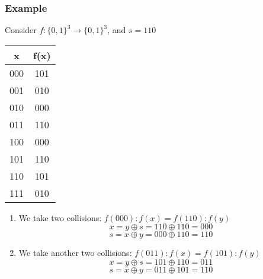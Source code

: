 \documentclass[11.5pt, paper=a4]{article}
\theoremstyle{definition}
\numberwithin{theorem}{section}
\begin{document}
\subsubsection{Example}
Consider $f:\{0,1\}^3\rightarrow \{0,1\}^3$, and $s= 110$
\begin{center}
\begin{tabular}{ |c|c| } 
 \hline
 x & f(x) \\ 
 \hline
 000 & 101 \\ 
 \hline
 001 & 010 \\ 
 \hline
 010 & 000 \\ 
 \hline
 011 & 110 \\
 \hline
 100 & 000 \\ 
 \hline
 101 & 110 \\
 \hline
 110 & 101 \\ 
 \hline
 111 & 010 \\
 \hline
\end{tabular}
\end{center}

\begin{enumerate}
  \item We take two collisions: $f(000):f(x) = f(110):f(y)$
  $$x = y\oplus s = 110 \oplus 110 = 000$$ $$s = x\oplus y = 000 \oplus 110 = 110$$
  \item We take another two collisions: $f(011):f(x) = f(101):f(y)$
  $$x = y\oplus s = 101 \oplus 110 = 011$$ $$s = x\oplus y = 011 \oplus 101 = 110$$
\end{enumerate}
\end{document}
